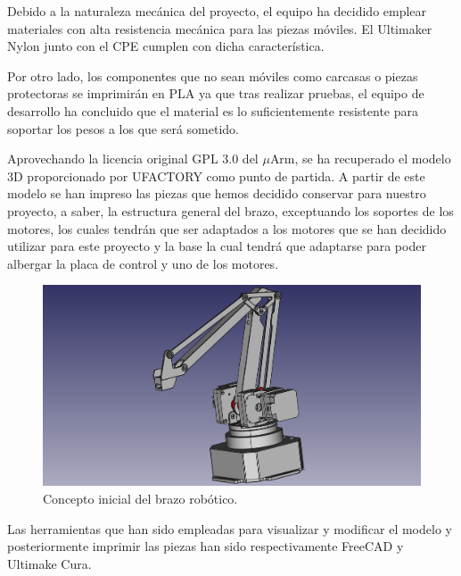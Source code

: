 Debido a la naturaleza mecánica del proyecto, el equipo ha decidido emplear materiales con alta resistencia mecánica para las piezas móviles. El Ultimaker Nylon junto con el CPE cumplen con dicha característica.

Por otro lado, los componentes que no sean móviles como carcasas o  
piezas protectoras se imprimirán en PLA ya que tras realizar pruebas, el equipo de desarrollo ha concluido que el material es lo suficientemente resistente para soportar los pesos a los que será sometido.

Aprovechando la licencia original GPL 3.0 del $\mu$Arm, se ha recuperado el modelo 3D proporcionado por UFACTORY como punto de partida. A partir de este modelo se han impreso las piezas que hemos decidido conservar para nuestro proyecto, a saber, la estructura general del brazo, exceptuando los soportes de los motores, los cuales tendrán que ser adaptados a los motores que se han decidido utilizar para este proyecto y la base la cual tendrá que adaptarse para poder albergar la placa de control y uno de los motores.

\begin{figure}[H]
    \centering
    \includegraphics[width=.8\linewidth]{pictures/brazo_vista_3d_inicial.png}
    \caption{Concepto inicial del brazo robótico.}
    \label{fig:manipulador_inicial}
\end{figure}

Las herramientas que han sido empleadas para visualizar y modificar el modelo y posteriormente imprimir las piezas han sido respectivamente FreeCAD y Ultimake Cura.

